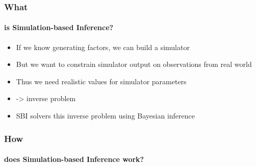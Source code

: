 \documentclass[9pt]{beamer}
\begin{document}
\begin{frame}
\frametitle{What}
\framesubtitle{is Simulation-based Inference?}
\begin{itemize}
	\item If we know generating factors, we can build a simulator
	\item But we want to constrain simulator output on observations from real world
	\item Thus we need realistic values for simulator parameters
	\item -> inverse problem
	\item SBI solvers this inverse problem using Bayesian inference
\end{itemize}
\end{frame} 


\begin{frame}
\frametitle{How}
\framesubtitle{does Simulation-based Inference work?}
\begin{figure}
\end{figure}
\end{frame} 
\end{document}
